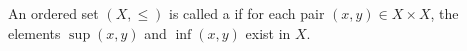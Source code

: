 An ordered set $(X, \leq)$ is called a  if for each pair $(x, y) \in X \times X$, the elements $\sup(x, y)$ and $\inf(x, y)$ exist in $X$.
